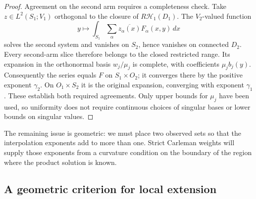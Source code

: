 \begin{proof}
Agreement on the second arm requires a completeness check.  Take
$z\in L^2(S_1;V_1)$ orthogonal to the closure of
$R\mathcal H_1(D_1)$.  The $V_2$-valued function
\[
 y\longmapsto\int_{S_1}\sum_\alpha\overline{z_\alpha(x)}F_\alpha(x,y)\,dx
\]
solves the second system and vanishes on $S_2$, hence vanishes on
connected $D_2$.  Every second-arm slice therefore belongs to the
closed restricted range.  Its expansion in the orthonormal basis
$w_j/\mu_j$ is complete, with coefficients $\mu_jb_j(y)$.
Consequently the series equals $F$ on $S_1\times O_2$; it converges
there by the positive exponent $\gamma_2$.  On $O_1\times S_2$ it is the
original expansion, converging with exponent $\gamma_1$.  These establish
both required agreements.  Only upper bounds for $\mu_j$ have been
used, so uniformity does not require continuous choices of singular
bases or lower bounds on singular values.
\end{proof}

The remaining issue is geometric: we must place two observed sets so
that the interpolation exponents add to more than one.  Strict Carleman
weights will supply those exponents from a curvature condition on the
boundary of the region where the product solution is known.

\subsection{A geometric criterion for local extension}

